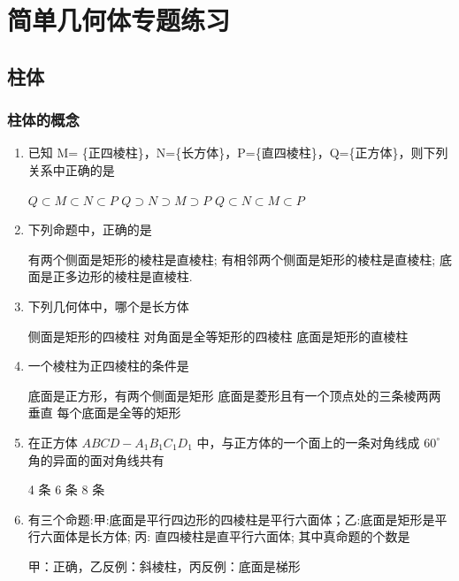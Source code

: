\chapter*{简单几何体专题练习}
\section*{柱体}
\subsection*{柱体的概念}
\begin{enumerate}
    \item 已知 M= \{正四棱柱\}，N=\{长方体\}，P=\{直四棱柱\}，Q=\{正方体\}，则下列关系中正确的是 

    {${Q} \subset  {M} \subset  {N} \subset  {P}$}
    {${Q} \supset  {N} \supset  {M} \supset  {P}$} 
    {${Q} \subset  {N} \subset  {M} \subset  {P}$}

    \item 下列命题中，正确的是

    {有两个侧面是矩形的棱柱是直棱柱;}
    {有相邻两个侧面是矩形的棱柱是直棱柱;}
    {底面是正多边形的棱柱是直棱柱.}

    \item 下列几何体中，哪个是长方体 

    {侧面是矩形的四棱柱}
    {对角面是全等矩形的四棱柱}
    {底面是矩形的直棱柱}

    \item 一个棱柱为正四棱柱的条件是 

    {底面是正方形，有两个侧面是矩形}
    {底面是菱形且有一个顶点处的三条棱两两垂直} 
    {每个底面是全等的矩形}

    \item 在正方体 ${{ABCD}} - {{A}}_{1}{{B}}_{1}{{C}}_{1}{{D}}_{1}$ 中，与正方体的一个面上的一条对角线成 ${60}^{ \circ  }$ 角的异面的面对角线共有 

    {4 条} 
    {6 条} 
    {8 条}
    \item 有三个命题:甲:底面是平行四边形的四棱柱是平行六面体；乙:底面是矩形是平行六面体是长方体; 丙: 直四棱柱是直平行六面体; 其中真命题的个数是
    \begin{jieda}
        甲：正确，乙反例：斜棱柱，丙反例：底面是梯形
    \end{jieda}

\end{enumerate}

